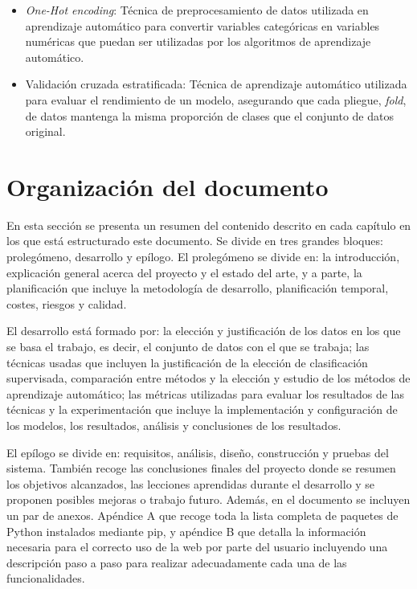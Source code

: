 \documentclass[12pt,a4paper]{report}
\begin{document}
\begin{itemize}
\item \emph{One-Hot encoding}: Técnica de preprocesamiento de datos utilizada en aprendizaje automático para convertir variables categóricas en variables numéricas que puedan ser utilizadas por los algoritmos de aprendizaje automático.

\item Validación cruzada estratificada: Técnica de aprendizaje automático utilizada para evaluar el rendimiento de un modelo, asegurando que cada pliegue, \emph{fold}, de datos mantenga la misma proporción de clases que el conjunto de datos original.
\end{itemize}


\section{Organización del documento}

En esta sección se presenta un resumen del contenido descrito en cada capítulo en los que está estructurado este documento. Se divide en tres grandes bloques: prolegómeno, desarrollo y epílogo. El prolegómeno se divide en: la introducción, explicación general acerca del proyecto y el estado del arte, y a parte, la planificación que incluye la metodología de desarrollo, planificación temporal, costes, riesgos y calidad. 

El desarrollo está formado por: la elección y justificación de los datos en los que se basa el trabajo, es decir, el conjunto de datos con el que se trabaja; las técnicas usadas que incluyen la justificación de la elección de clasificación supervisada, comparación entre métodos y la elección y estudio de los métodos de aprendizaje automático; las métricas utilizadas para evaluar los resultados de las técnicas y la experimentación que incluye la implementación y configuración de los modelos, los resultados, análisis y conclusiones de los resultados.

El epílogo se divide en: requisitos, análisis, diseño, construcción y pruebas del sistema. También recoge las conclusiones finales del proyecto donde se resumen los objetivos alcanzados, las lecciones aprendidas durante el desarrollo y se proponen posibles mejoras o trabajo futuro. Además, en el documento se incluyen un par de anexos. Apéndice A que recoge toda la lista completa de paquetes de Python instalados mediante pip, y apéndice B que detalla la información necesaria para el correcto uso de la web por parte del usuario incluyendo una descripción paso a paso para realizar adecuadamente cada una de las funcionalidades.
\end{document}
